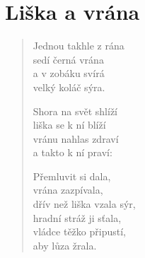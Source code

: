 \section{Liška a vrána}

\thispagestyle{empty}

\begin{verse}

Jednou takhle z rána\\
sedí černá vrána\\
a v zobáku svírá\\
velký koláč sýra.

Shora na svět shlíží\\
liška se k ní blíží\\
vránu nahlas zdraví\\
a takto k ní praví:


Přemluvit si dala,\\
vrána zazpívala,\\
dřív než liška vzala sýr,\\
hradní stráž ji sťala,\\
vládce těžko připustí,\\
aby lůza žrala.

\end{verse}
